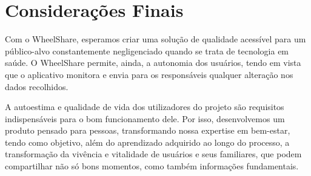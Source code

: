 \chapter{Considerações Finais}
\label{chapter:consideracoes}

Com o WheelShare, esperamos criar uma solução de qualidade acessível para um público-alvo constantemente negligenciado quando se trata de tecnologia em saúde. O WheelShare permite, ainda, a autonomia dos usuários, tendo em vista que o aplicativo monitora e envia para os responsáveis qualquer alteração nos dados recolhidos.

A autoestima e qualidade de vida dos utilizadores do projeto são requisitos indispensáveis para o bom funcionamento dele. Por isso, desenvolvemos um produto pensado para pessoas, transformando nossa expertise em bem-estar, tendo como objetivo, além do aprendizado adquirido ao longo do processo, a transformação da vivência e vitalidade de usuários e seus familiares, que podem compartilhar não só bons momentos, como também informações fundamentais.

